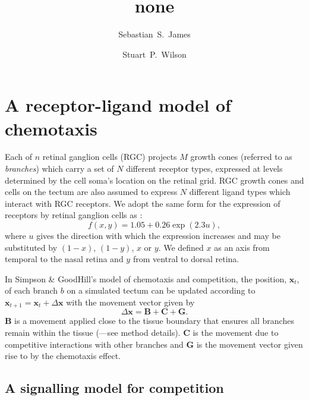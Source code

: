 \documentclass[9pt]{elife} %
\title {none}
\author[1]{Sebastian~S.~James}
\author[1*]{Stuart~P.~Wilson}
\affil[1]{Department of Psychology, The University of Sheffield, Sheffield, United Kingdom.}
\begin{document}

\section{A receptor-ligand model of chemotaxis}


Each of $n$ retinal ganglion cells (RGC) projects $M$ growth cones (referred to as \emph{branches}) which carry a set of $N$ different receptor types, expressed at levels determined by the cell soma's location on the retinal grid. RGC growth cones and cells on the tectum are also assumed to express $N$ different ligand types which interact with RGC receptors.
%
We adopt the same form for the expression of receptors by retinal ganglion cells as
\citet{simpson_simple_2011}:
\begin{equation} \label{e:f}
  f(x,y) = 1.05 + 0.26 \exp(2.3 u),
\end{equation}
where $u$ gives the direction with which the expression increases and may be substituted by $(1-x)$, $(1-y)$, $x$ or $y$. We defined $x$ as an axis from temporal to the nasal retina and $y$ from ventral to dorsal retina.


In Simpson \& GoodHill's model of chemotaxis and competition, the position, $\mathbf{x}_t$, of each branch $b$ on a simulated tectum can be updated according to $\mathbf{x}_{t+1} = \mathbf{x}_{t} + \Delta \mathbf{x}$ with the movement vector given by
\begin{equation} \label{e:dX}
 \Delta \mathbf{x} = \mathbf{B} + \mathbf{C} + \mathbf{G}.
\end{equation}
$\mathbf{B}$ is a movement applied close to the tissue boundary that ensures all branches remain within the tissue (\citet{holt_target_1998}---see method details).
%
%
$\mathbf{C}$ is the movement due to competitive interactions with other branches
and $\mathbf{G}$ is the movement vector given rise to by the chemotaxis effect.


\subsection*{A signalling model for competition}
\end{document}

